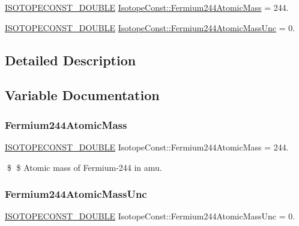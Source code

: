 \begin{DoxyCompactItemize}
\item 
\mbox{\hyperlink{group___isotope_const-_macros_ga8f45a7272ce02c0b4c65c44636ed719a}{I\+S\+O\+T\+O\+P\+E\+C\+O\+N\+S\+T\+\_\+\+D\+O\+U\+B\+LE}} \mbox{\hyperlink{group___isotope_const-_fermium-_fm244_gabe571096511104c66025af12df20cc7e}{Isotope\+Const\+::\+Fermium244\+Atomic\+Mass}} = 244.
\item 
\mbox{\hyperlink{group___isotope_const-_macros_ga8f45a7272ce02c0b4c65c44636ed719a}{I\+S\+O\+T\+O\+P\+E\+C\+O\+N\+S\+T\+\_\+\+D\+O\+U\+B\+LE}} \mbox{\hyperlink{group___isotope_const-_fermium-_fm244_ga93a17ee615b55b6033445b0828f93919}{Isotope\+Const\+::\+Fermium244\+Atomic\+Mass\+Unc}} = 0.
\end{DoxyCompactItemize}


\subsection{Detailed Description}


\subsection{Variable Documentation}
\mbox{\label{group___isotope_const-_fermium-_fm244_gabe571096511104c66025af12df20cc7e}} 
\subsubsection{\texorpdfstring{Fermium244\+Atomic\+Mass}{Fermium244AtomicMass}}
{\footnotesize\ttfamily \mbox{\hyperlink{group___isotope_const-_macros_ga8f45a7272ce02c0b4c65c44636ed719a}{I\+S\+O\+T\+O\+P\+E\+C\+O\+N\+S\+T\+\_\+\+D\+O\+U\+B\+LE}} Isotope\+Const\+::\+Fermium244\+Atomic\+Mass = 244.}

\$ \$ Atomic mass of Fermium-\/244 in amu. \mbox{\label{group___isotope_const-_fermium-_fm244_ga93a17ee615b55b6033445b0828f93919}} 
\subsubsection{\texorpdfstring{Fermium244\+Atomic\+Mass\+Unc}{Fermium244AtomicMassUnc}}
{\footnotesize\ttfamily \mbox{\hyperlink{group___isotope_const-_macros_ga8f45a7272ce02c0b4c65c44636ed719a}{I\+S\+O\+T\+O\+P\+E\+C\+O\+N\+S\+T\+\_\+\+D\+O\+U\+B\+LE}} Isotope\+Const\+::\+Fermium244\+Atomic\+Mass\+Unc = 0.}

